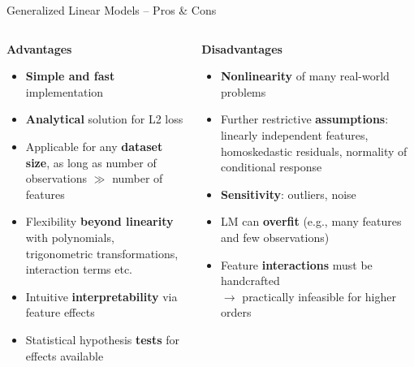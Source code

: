 \documentclass[11pt,compress,t,notes=noshow, xcolor=table]{beamer}
\newcommand{\highlight}[1]{\textcolor{hlcol}{\textbf{#1}}}
\newcommand{\positem}{\item[\textcolor{hlcol}{$\bm{+}$}]}
\newcommand{\negitem}{\item[\textcolor{hlcol}{$\bm{-}$}]}
\newenvironment{procon}{
\begin{itemize}
  \setlength{\itemsep}{1.5pt}
  \setlength{\parskip}{1.5pt}
}{\end{itemize}}
\begin{document}
\begin{frame2}{Generalized Linear Models -- Pros \& Cons}

  \begin{columns}[onlytextwidth]
    \begin{column}{0.5\textwidth}
      \highlight{Advantages}
      
      \begin{procon}
        \setlength{\itemsep}{1pt}
        \setlength{\parskip}{1pt}
        \positem \textbf{Simple and fast} implementation
        \positem \textbf{Analytical} solution for L2 loss
        \positem Applicable for any \textbf{dataset size}, as long as number of 
        observations $\gg$ number of features
        \positem Flexibility \textbf{beyond linearity} with polynomials, 
        trigonometric transformations, interaction terms etc.
        \positem Intuitive \textbf{interpretability} via feature effects
        \positem Statistical hypothesis \textbf{tests} for effects available
      \end{procon}
    \end{column}
  
    \begin{column}{0.5\textwidth}
      \highlight{Disadvantages}
      
      \begin{itemize}
        \negitem \textbf{Nonlinearity} of many real-world problems
        \negitem Further restrictive \textbf{assumptions}: linearly independent 
        features, homoskedastic residuals, normality of conditional response 
        \negitem \textbf{Sensitivity}: outliers, noise
        \negitem LM can \textbf{overfit} (e.g., many features and few observations) 
        \negitem Feature \textbf{interactions} must be handcrafted\\
        $\rightarrow$ practically infeasible for higher orders
      \end{itemize}
    \end{column}
  \end{columns}
  
\end{frame2}
\end{document}
